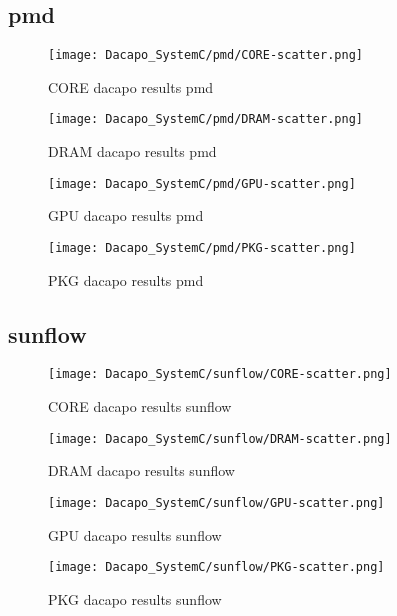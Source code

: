 \documentclass{article}
\begin{document}
\subsection{pmd}
    \begin{figure}[H]
    	\centering
    	\texttt{[image: Dacapo\_SystemC/pmd/CORE-scatter.png]}
    	\caption{CORE dacapo results pmd}
    	\label{fig:pmd-CORE}
    \end{figure}
    \begin{figure}[H]
    	\centering
    	\texttt{[image: Dacapo\_SystemC/pmd/DRAM-scatter.png]}
    	\caption{DRAM dacapo results pmd}
    	\label{fig:pmd-fix-DRAM}
    \end{figure}
    \begin{figure}[H]
    	\centering
    	\texttt{[image: Dacapo\_SystemC/pmd/GPU-scatter.png]}
    	\caption{GPU dacapo results pmd}
    	\label{fig:pmd-fix-GPU}
    \end{figure}
    \begin{figure}[H]
    	\centering
    	\texttt{[image: Dacapo\_SystemC/pmd/PKG-scatter.png]}
    	\caption{PKG dacapo results pmd}
    	\label{fig:pmd-fix-PKG}
    \end{figure}
    
\subsection{sunflow}
    \begin{figure}[H]
    	\centering
    	\texttt{[image: Dacapo\_SystemC/sunflow/CORE-scatter.png]}
    	\caption{CORE dacapo results sunflow}
    	\label{fig:sunflow-CORE}
    \end{figure}
    \begin{figure}[H]
    	\centering
    	\texttt{[image: Dacapo\_SystemC/sunflow/DRAM-scatter.png]}
    	\caption{DRAM dacapo results sunflow}
    	\label{fig:sunflow-fix-DRAM}
    \end{figure}
    \begin{figure}[H]
    	\centering
    	\texttt{[image: Dacapo\_SystemC/sunflow/GPU-scatter.png]}
    	\caption{GPU dacapo results sunflow}
    	\label{fig:sunflow-fix-GPU}
    \end{figure}
    \begin{figure}[H]
    	\centering
    	\texttt{[image: Dacapo\_SystemC/sunflow/PKG-scatter.png]}
    	\caption{PKG dacapo results sunflow}
    	\label{fig:sunflow-fix-PKG}
    \end{figure}
    
\end{document}
